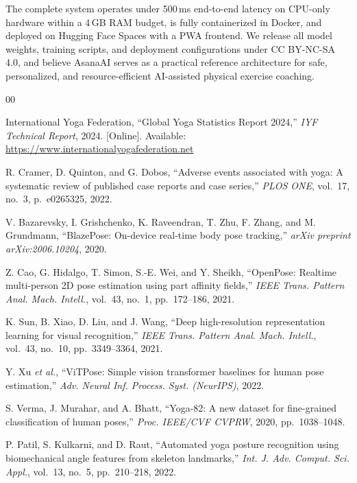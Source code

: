 \documentclass[conference]{IEEEtran}
\begin{document}
The complete system operates under 500\,ms end-to-end latency on CPU-only hardware within
a 4\,GB RAM budget, is fully containerized in Docker, and deployed on Hugging Face Spaces
with a PWA frontend. We release all model weights, training scripts, and deployment
configurations under CC BY-NC-SA 4.0, and believe AsanaAI serves as a practical reference
architecture for safe, personalized, and resource-efficient AI-assisted physical
exercise coaching.

\FloatBarrier
\begin{thebibliography}{00}

International Yoga Federation, ``Global Yoga Statistics Report 2024,'' \textit{IYF
Technical Report}, 2024. [Online]. Available: \url{https://www.internationalyogafederation.net}

R. Cramer, D. Quinton, and G. Dobos, ``Adverse events associated with yoga: A systematic
review of published case reports and case series,'' \textit{PLOS ONE}, vol.~17, no.~3,
p.~e0265325, 2022.

V. Bazarevsky, I. Grishchenko, K. Raveendran, T. Zhu, F. Zhang, and M. Grundmann,
``BlazePose: On-device real-time body pose tracking,'' \textit{arXiv preprint
arXiv:2006.10204}, 2020.

Z. Cao, G. Hidalgo, T. Simon, S.-E. Wei, and Y. Sheikh, ``OpenPose: Realtime multi-person
2D pose estimation using part affinity fields,'' \textit{IEEE Trans. Pattern Anal.
Mach. Intell.}, vol.~43, no.~1, pp.~172--186, 2021.

K. Sun, B. Xiao, D. Liu, and J. Wang, ``Deep high-resolution representation learning for
visual recognition,'' \textit{IEEE Trans. Pattern Anal. Mach. Intell.}, vol.~43, no.~10,
pp.~3349--3364, 2021.

Y. Xu \textit{et al.}, ``ViTPose: Simple vision transformer baselines for human pose
estimation,'' \textit{Adv. Neural Inf. Process. Syst. (NeurIPS)}, 2022.

S. Verma, J. Murahar, and A. Bhatt, ``Yoga-82: A new dataset for fine-grained
classification of human poses,'' \textit{Proc. IEEE/CVF CVPRW}, 2020, pp.~1038--1048.

P. Patil, S. Kulkarni, and D. Raut, ``Automated yoga posture recognition using biomechanical
angle features from skeleton landmarks,'' \textit{Int. J. Adv. Comput. Sci. Appl.},
vol.~13, no.~5, pp.~210--218, 2022.


\end{thebibliography}
\end{document}
